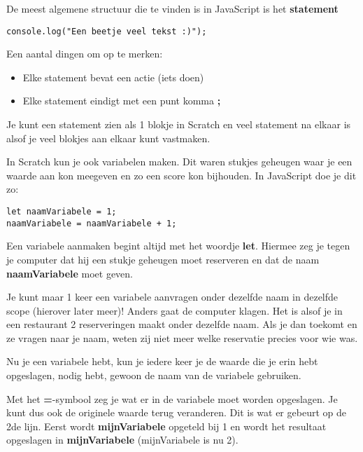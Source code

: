 De meest algemene structuur die te vinden is in JavaScript is het
\textbf{statement} 
\begin{verbatim}
console.log("Een beetje veel tekst :)");
\end{verbatim}
Een aantal dingen om op te merken:
\begin{itemize}
    \item Elke statement bevat een actie (iets doen)
    \item Elke statement eindigt met een punt komma \textbf{;} 
\end{itemize}

Je kunt een statement zien als 1 blokje in Scratch en veel statement na elkaar
is alsof je veel blokjes aan elkaar kunt vastmaken.

In Scratch kun je ook variabelen maken. Dit waren stukjes geheugen waar je een 
waarde aan kon meegeven en zo een score kon bijhouden. In JavaScript doe je dit
zo:
\begin{verbatim}
let naamVariabele = 1;
naamVariabele = naamVariabele + 1;
\end{verbatim}
Een variabele aanmaken begint altijd met het woordje \textbf{let}. Hiermee zeg
je tegen je computer dat hij een stukje geheugen moet reserveren en dat de naam
\textbf{naamVariabele} moet geven.

\Opm Je kunt maar 1 keer een variabele aanvragen onder dezelfde naam in
dezelfde scope (hierover later meer)! Anders gaat de computer klagen. Het is
alsof je in een restaurant 2 reserveringen maakt onder  dezelfde naam. Als je
dan toekomt en ze vragen naar je naam, weten zij niet meer welke reservatie
precies voor wie was.

Nu je een variabele hebt, kun je iedere keer je de waarde die je erin hebt
opgeslagen, nodig hebt, gewoon de naam van de variabele gebruiken.

Met het \textbf{=}-symbool zeg je wat er in de variabele moet worden opgeslagen.
Je kunt dus ook de originele waarde terug veranderen. Dit is wat er gebeurt op
de 2de lijn. Eerst wordt \textbf{mijnVariabele} opgeteld bij 1 en wordt het
resultaat opgeslagen in \textbf{mijnVariabele} (mijnVariabele is nu 2).


